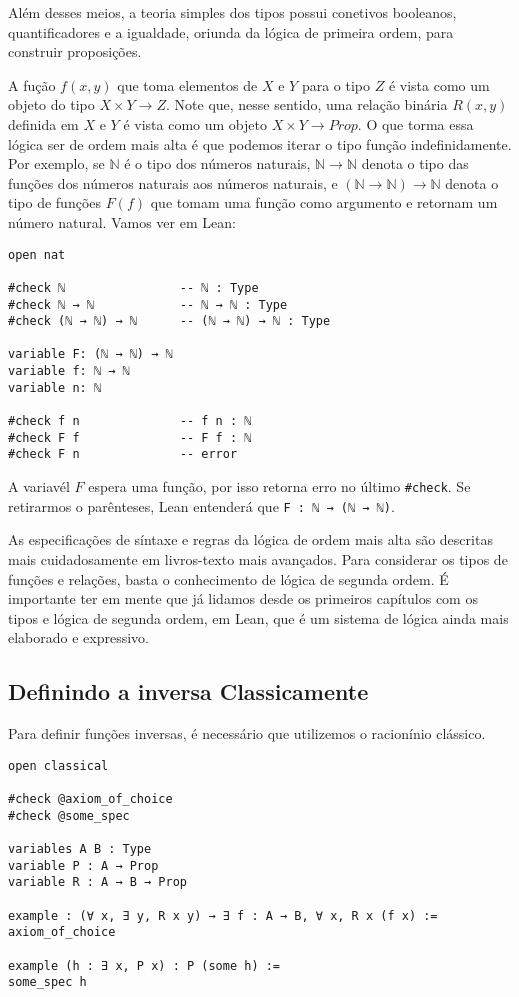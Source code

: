 Além desses meios, a teoria simples dos tipos possui conetivos booleanos, quantificadores e a igualdade, oriunda da lógica
de primeira ordem, para construir proposições. 

A fução $f(x,y)$ que toma elementos de $X$ e $Y$ para o tipo $Z$ é vista como um objeto do tipo $X \times Y \to Z$. Note que,
nesse sentido, uma relação binária $R(x,y)$ definida em $X$ e $Y$ é vista como um objeto $X \times Y \to Prop$. O que torma essa 
lógica ser de ordem mais alta é que podemos iterar o tipo função indefinidamente. Por exemplo, se $\mathbb{N}$ é o tipo dos números
naturais, $\mathbb{N} \to \mathbb{N}$ denota o tipo das funções dos números naturais aos números naturais, e $(\mathbb{N} \to \mathbb{N}) \to \mathbb{N}$ 
denota o tipo de funções $F(f)$ que tomam uma função como argumento e retornam um número natural. Vamos ver em Lean:

\begin{lstlisting}
open nat 

#check ℕ                -- ℕ : Type
#check ℕ → ℕ            -- ℕ → ℕ : Type
#check (ℕ → ℕ) → ℕ      -- (ℕ → ℕ) → ℕ : Type 

variable F: (ℕ → ℕ) → ℕ 
variable f: ℕ → ℕ
variable n: ℕ 

#check f n              -- f n : ℕ 
#check F f              -- F f : ℕ 
#check F n              -- error
\end{lstlisting}

A variavél $F$ espera uma função, por isso retorna erro no último \lstinline{#check}. Se retirarmos o parênteses, Lean entenderá que 
\lstinline{F : ℕ → (ℕ → ℕ)}. 

As especificações de síntaxe e regras da lógica de ordem mais alta são descritas mais cuidadosamente em livros-texto mais avançados. 
Para considerar os tipos de funções e relações, basta o conhecimento de lógica de segunda ordem. É importante ter em mente que já lidamos 
desde os primeiros capítulos com os tipos e lógica de segunda ordem, em Lean, que é um sistema de lógica ainda mais elaborado e expressivo. 

\subsection{Definindo a inversa Classicamente}

Para definir funções inversas, é necessário que utilizemos o racionínio clássico. 

\begin{lstlisting}
open classical 

#check @axiom_of_choice
#check @some_spec

variables A B : Type
variable P : A → Prop   
variable R : A → B → Prop

example : (∀ x, ∃ y, R x y) → ∃ f : A → B, ∀ x, R x (f x) :=
axiom_of_choice

example (h : ∃ x, P x) : P (some h) :=
some_spec h    
\end{lstlisting}

